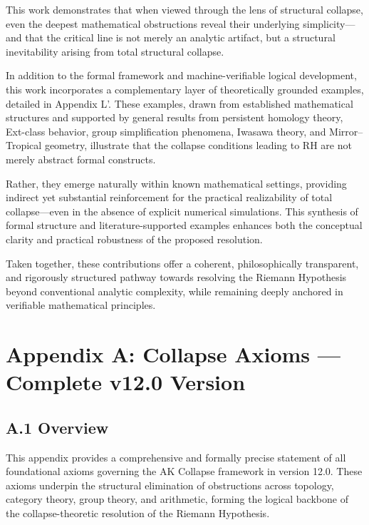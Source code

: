 \documentclass[11pt]{article}
\begin{document}
This work demonstrates that when viewed through the lens of structural collapse, even the deepest mathematical obstructions reveal their underlying simplicity—and that the critical line is not merely an analytic artifact, but a structural inevitability arising from total structural collapse.

In addition to the formal framework and machine-verifiable logical development, this work incorporates a complementary layer of theoretically grounded examples, detailed in Appendix L'. These examples, drawn from established mathematical structures and supported by general results from persistent homology theory, Ext-class behavior, group simplification phenomena, Iwasawa theory, and Mirror–Tropical geometry, illustrate that the collapse conditions leading to RH are not merely abstract formal constructs.

Rather, they emerge naturally within known mathematical settings, providing indirect yet substantial reinforcement for the practical realizability of total collapse—even in the absence of explicit numerical simulations. This synthesis of formal structure and literature-supported examples enhances both the conceptual clarity and practical robustness of the proposed resolution.

Taken together, these contributions offer a coherent, philosophically transparent, and rigorously structured pathway towards resolving the Riemann Hypothesis beyond conventional analytic complexity, while remaining deeply anchored in verifiable mathematical principles.



\section*{Appendix A: Collapse Axioms — Complete v12.0 Version}

\subsection*{A.1 Overview}

This appendix provides a comprehensive and formally precise statement of all foundational axioms governing the AK Collapse framework in version 12.0. These axioms underpin the structural elimination of obstructions across topology, category theory, group theory, and arithmetic, forming the logical backbone of the collapse-theoretic resolution of the Riemann Hypothesis.
\end{document}
